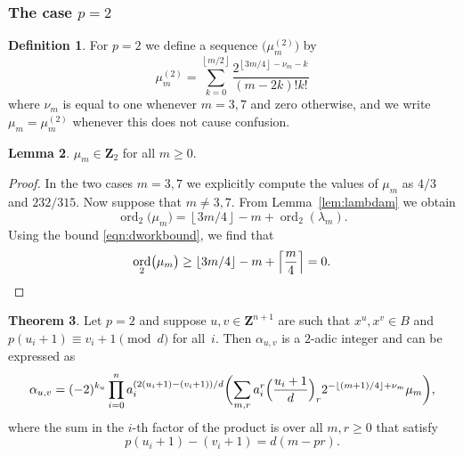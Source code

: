 \documentclass[a4paper,11pt]{article}
\numberwithin{equation}{section}
\providecommand{\floor}[1]{\left\lfloor#1\right\rfloor}   %
\providecommand{\ceil}[1]{\left\lceil#1\right\rceil}   %
\newcommand{\ZZ}{\mathbf{Z}} %
\DeclareMathOperator{\ord}{ord}          %
\theoremstyle{definition}
\newtheorem{thm}{Theorem}[section]
\newtheorem{lem}[thm]{Lemma}
\newtheorem{defn}[thm]{Definition}
\begin{document}
\subsubsection{The case $p = 2$}

\begin{defn}
For $p = 2$ we define a sequence $\bigl(\mu_m^{(2)}\bigr)$ by 
\begin{equation*}
\mu_m^{(2)} = 
    \sum_{k=0}^{\floor{m/2}} \frac{2^{\floor{3m/4} - \nu_m - k}}{(m-2k)! k!}
\end{equation*}
where $\nu_m$ is equal to one whenever $m = 3, 7$ and zero otherwise, 
and we write $\mu_m =\mu_m^{(2)}$ whenever this does not cause confusion. 
\end{defn}

\begin{lem} \label{lem:mu2}
$\mu_m \in \ZZ_2$ for all $m \geq 0$.
\end{lem}

\begin{proof}
In the two cases $m = 3, 7$ we explicitly compute the values of 
$\mu_m$ as $4/3$ and $232/315$.  Now suppose that $m \neq 3, 7$. 
From Lemma~\ref{lem:lambdam} we obtain 
\begin{equation*}
\ord_2 \bigl(\mu_m\bigr) 
    = \floor{3m/4} - m + \ord_2(\lambda_m).
\end{equation*}
Using the bound \eqref{eqn:dworkbound}, we find that 
\begin{equation*}
\ord_2 \bigl(\mu_m\bigr) 
    \geq \floor{3m/4} - m + \ceil{\frac{m}{4}} = 0. \qedhere
\end{equation*}
\end{proof}

\begin{thm} \label{thm:alpha2}
Let $p = 2$ and suppose $u, v \in \ZZ^{n+1}$ are such that 
$x^u, x^v \in B$ and $p (u_i + 1) \equiv v_i + 1 \pmod{d}$ 
for all~$i$.  Then $\alpha_{u,v}$ is a $2$-adic integer and can be expressed as 
\begin{equation*}
\alpha_{u,v} = (-2)^{k_u} \prod_{i=0}^n a_i^{(2 (u_i + 1) - (v_i + 1))/d} \biggl( \sum_{m,r} a_i^{r} \Bigl(\frac{u_i+1}{d}\Bigr)_r 2^{-\floor{(m+1)/4}+\nu_m} \mu_m \biggr), 
\end{equation*}
where the sum in the $i$-th factor of the product is over all $m, r \geq 0$  
that satisfy
\[
p(u_i+1)-(v_i+1)=d(m-pr).
\]
\end{thm}
\end{document}

